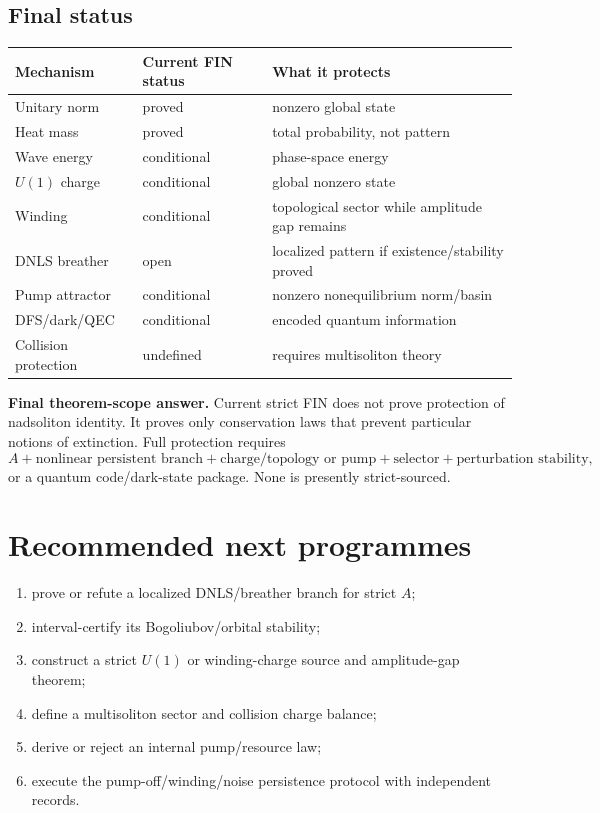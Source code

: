 \documentclass[11pt,a4paper]{article}
\begin{document}
\subsection{Final status}
\begin{longtable}{@{}p{}p{}p{}@{}}\toprule Mechanism&Current FIN status&What it protects\\\midrule\endhead
Unitary norm&proved&nonzero global state\\
Heat mass&proved&total probability, not pattern\\
Wave energy&conditional&phase-space energy\\
$U(1)$ charge&conditional&global nonzero state\\
Winding&conditional&topological sector while amplitude gap remains\\
DNLS breather&open&localized pattern if existence/stability proved\\
Pump attractor&conditional&nonzero nonequilibrium norm/basin\\
DFS/dark/QEC&conditional&encoded quantum information\\
Collision protection&undefined&requires multisoliton theory\\\bottomrule\end{longtable}

\textbf{Final theorem-scope answer.} Current strict FIN does not prove protection of nadsoliton identity. It proves only conservation laws that prevent particular notions of extinction. Full protection requires
\[
A+\text{nonlinear persistent branch}+\text{charge/topology or pump}+\text{selector}+\text{perturbation stability},
\]
or a quantum code/dark-state package. None is presently strict-sourced.

\section{Recommended next programmes}
\begin{enumerate}
\item prove or refute a localized DNLS/breather branch for strict $A$;
\item interval-certify its Bogoliubov/orbital stability;
\item construct a strict $U(1)$ or winding-charge source and amplitude-gap theorem;
\item define a multisoliton sector and collision charge balance;
\item derive or reject an internal pump/resource law;
\item execute the pump-off/winding/noise persistence protocol with independent records.
\end{enumerate}
\end{document}
